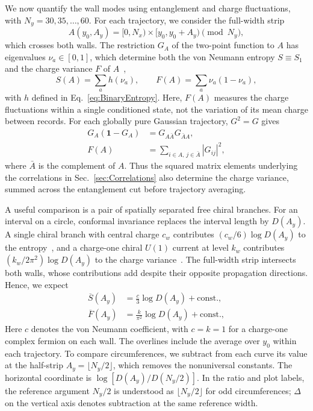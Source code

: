 \documentclass[aps,prb,10pt,twocolumn,superscriptaddress,longbibliography,floatfix]{revtex4-2}
\newcommand{\newtext}[1]{{\color{blue}#1}}
\begin{document}
{\color{blue}
We now quantify the wall modes using entanglement and charge fluctuations, with $N_y=30,35,\ldots,60$. For each trajectory, we consider the full-width strip
\begin{equation}
    A(y_0,A_y)=[0,N_x)\times[y_0,y_0+A_y)\pmod{N_y},
    \label{eq:Strip}
\end{equation}
which crosses both walls. The restriction $G_A$ of the two-point function to $A$ has eigenvalues $\nu_a\in[0,1]$, which determine both the von Neumann entropy $S\equiv S_1$ and the charge variance $F$ of $A$~\cite{KlichLevitov2009,SongFlindtRachel2011},
\begin{equation}
    S(A)=\sum_a h(\nu_a),
    \qquad
    F(A)=\sum_a\nu_a(1-\nu_a),
    \label{eq:EntropyVariance}
\end{equation}
\newtext{with $h$ defined in Eq.~\eqref{eq:BinaryEntropy}.}
Here, $F(A)$ measures the charge fluctuations within a single conditioned state, not the variation of its mean charge between records. For each globally pure Gaussian trajectory, $G^2=G$ gives
\begin{align}
 G_A(\mathbf{1}-G_A)&=G_{A\bar A}G_{\bar A A},\nonumber\\
 F(A)&=\sum_{i\in A,\,j\in\bar A}|G_{ij}|^2,
 \label{eq:VarianceCrossCut}
\end{align}
where $\bar A$ is the complement of $A$. Thus the squared matrix elements underlying the correlations in Sec.~\ref{sec:Correlations} also determine the charge variance, summed across the entanglement cut before trajectory averaging.
}

{\color{blue}
\newtext{A useful comparison is a pair of spatially separated free chiral branches.} For an interval on a circle, conformal invariance replaces the interval length by $D(A_y)$. A single chiral branch with central charge $c_w$ contributes $(c_w/6)\log D(A_y)$ to the entropy~\cite{CalabreseCardy2004}, and a charge-one chiral $U(1)$ current at level $k_w$ contributes $(k_w/2\pi^2)\log D(A_y)$ to the charge variance~\cite{DiFrancescoMathieuSenechal1997}. The full-width strip intersects both walls, whose contributions add despite their opposite propagation directions. Hence, we expect
\begin{align}
    \overline{S}(A_y)&=\frac{c}{3}\log D(A_y)+\text{const.},\nonumber\\
    \overline{F}(A_y)&=\frac{k}{\pi^2}\log D(A_y)+\text{const.},
    \label{eq:CFTScaling}
\end{align}
\newtext{Here $c$ denotes the von Neumann coefficient, with $c=k=1$ for a charge-one complex fermion on each wall.} \newtext{The overlines include the average over $y_0$ within each trajectory.} To compare circumferences, we subtract from each curve its value at the half-strip \newtext{$A_y=\lfloor N_y/2\rfloor$}, which removes the nonuniversal constants. \newtext{The horizontal coordinate is $\log[D(A_y)/D(N_y/2)]$. In the ratio and plot labels, the reference argument $N_y/2$ is understood as $\lfloor N_y/2\rfloor$ for odd circumferences; $\Delta$ on the vertical axis denotes subtraction at the same reference width.}
}
\end{document}
